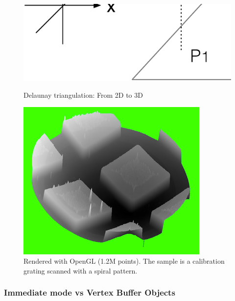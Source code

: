 \begin{figure}[!ht]
\begin{minipage}[b]{0.45\linewidth}
\centering
\includegraphics[width=\textwidth]{images/delaunay.eps}
    \caption{Delaunay triangulation: From 2D to 3D}
\label{triangulation3d}
\end{minipage}
\hspace{0.5cm}
\begin{minipage}[b]{0.45\linewidth}
\centering
\includegraphics[width=\textwidth]{images/3drendering.png}
    \caption{Rendered with OpenGL (1.2M points). The sample is a calibration grating scanned with a spiral pattern.}
\label{rendering3d}
\end{minipage}
\end{figure}

\subsubsection{Immediate mode vs Vertex Buffer Objects}

